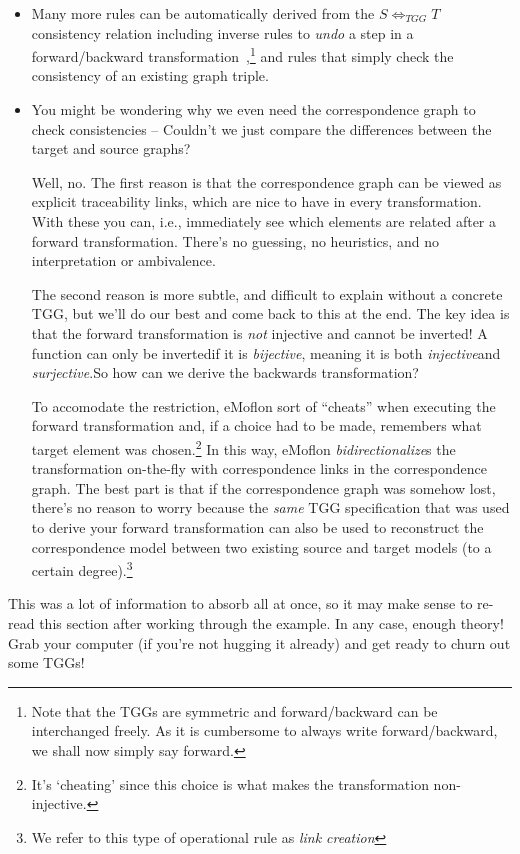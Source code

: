 \begin{itemize}

\item Many more rules can be automatically derived from the $S \Leftrightarrow_{TGG} T$ consistency relation including inverse rules to \emph{undo} a step in a
forward/backward transformation~\cite{LAVS_ICGT_2012},\footnote{Note
that the TGGs are symmetric and forward/backward can be interchanged freely.  As it is cumbersome to always write forward/backward, we shall now simply say
forward.} and rules that simply check the consistency of an existing graph triple.

\item You might be wondering why we even need the correspondence graph to check consistencies -- Couldn't we just compare the differences between the target and
source graphs?

Well, no. The first reason is that the correspondence graph can be viewed as explicit traceability links, which are nice to have in every transformation. With
these you can, i.e., immediately see which elements are related after a forward transformation. There's no guessing, no heuristics, and no
interpretation or ambivalence.

The second reason is more subtle, and difficult to explain without a concrete TGG, but we'll do our best and come back to this at the end. The key idea is that
the forward transformation is \emph{not} injective and cannot be inverted! A function can only be invertedif it is \emph{bijective}, meaning
it is both \emph{injective}and \emph{surjective}.So how can we derive the backwards transformation?

To accomodate the restriction, eMoflon sort of ``cheats'' when executing the forward transformation and, if a choice had to be made, remembers what target
element was chosen.\footnote{It's `cheating' since this choice is what makes the transformation non-injective.} In this way, eMoflon \emph{bidirectionalize}s
the transformation on-the-fly with correspondence links in the correspondence graph. The best part is that if the correspondence graph was somehow lost, there's
no reason to worry because the \emph{same} TGG specification that was used to derive your forward transformation can also be used to reconstruct the
correspondence model between two existing source and target models (to a certain degree).\footnote{We refer to this type of operational rule as \emph{link
creation}}

\end{itemize}
This was a lot of information to absorb all at once, so it may make sense to re-read this section after working through the example. In any case, enough theory!
Grab your computer (if you're not hugging it already) and get ready to churn out some TGGs!
